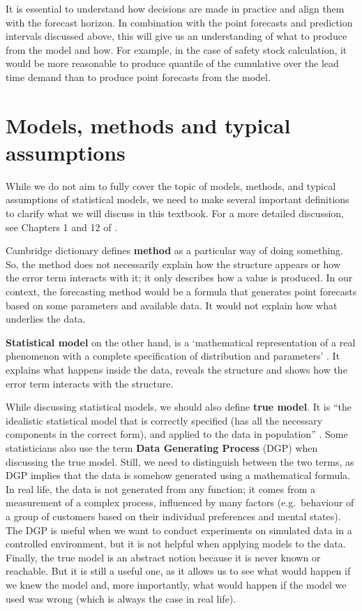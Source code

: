 \documentclass[
]{book}
\theoremstyle{definition}
\theoremstyle{definition}
\theoremstyle{definition}
\theoremstyle{definition}
\theoremstyle{remark}
\begin{document}
It is essential to understand how decisions are made in practice and align them with the forecast horizon. In combination with the point forecasts and prediction intervals discussed above, this will give us an understanding of what to produce from the model and how. For example, in the case of safety stock calculation, it would be more reasonable to produce quantile of the cumulative over the lead time demand than to produce point forecasts from the model.

\hypertarget{modelsMethods}{%
\section{Models, methods and typical assumptions}\label{modelsMethods}}

While we do not aim to fully cover the topic of models, methods, and typical assumptions of statistical models, we need to make several important definitions to clarify what we will discuss in this textbook. For a more detailed discussion, see Chapters 1 and 12 of \citet{SvetunkovSBA}.

Cambridge dictionary \citep{CambridgeMethod} defines \textbf{method} as a particular way of doing something. So, the method does not necessarily explain how the structure appears or how the error term interacts with it; it only describes how a value is produced. In our context, the forecasting method would be a formula that generates point forecasts based on some parameters and available data. It would not explain how what underlies the data.

\textbf{Statistical model} on the other hand, is a `mathematical representation of a real phenomenon with a complete specification of distribution and parameters' \citep{Svetunkov2019a}. It explains what happens inside the data, reveals the structure and shows how the error term interacts with the structure.

While discussing statistical models, we should also define \textbf{true model}. It is ``the idealistic statistical model that is correctly specified (has all the necessary components in the correct form), and applied to the data in population'' \citep{SvetunkovSBA}. Some statisticians also use the term \textbf{Data Generating Process} (DGP) when discussing the true model. Still, we need to distinguish between the two terms, as DGP implies that the data is somehow generated using a mathematical formula. In real life, the data is not generated from any function; it comes from a measurement of a complex process, influenced by many factors (e.g.~behaviour of a group of customers based on their individual preferences and mental states). The DGP is useful when we want to conduct experiments on simulated data in a controlled environment, but it is not helpful when applying models to the data. Finally, the true model is an abstract notion because it is never known or reachable. But it is still a useful one, as it allows us to see what would happen if we knew the model and, more importantly, what would happen if the model we used was wrong (which is always the case in real life).
\end{document}
